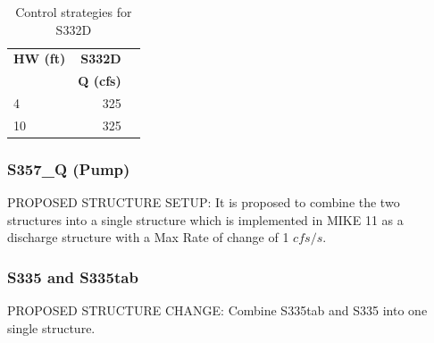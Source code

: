 \footnotesize
\begin{table}[!h]
\centering
\caption{Control strategies for S332D}
\label{tab:CS-S332DC}
\begin{tabular}{l|rr}
\hline
\textbf{HW (ft)} &  \textbf{S332D} \\
\textbf{       } & \textbf{Q (cfs)} \\
\hline
4	     &    325  \\
10	     &    325  \\
\hline
\end{tabular}
\end{table}
\normalsize

\subsubsection{S357\_Q (Pump)}

PROPOSED STRUCTURE SETUP: It is proposed to combine the two structures into a single structure which is implemented in MIKE 11 as a discharge structure with a Max Rate of change of 1 $cfs/s$.

\subsubsection{S335 and S335tab}

PROPOSED STRUCTURE CHANGE: Combine S335tab and S335 into one single structure.

\cleardoublepage
